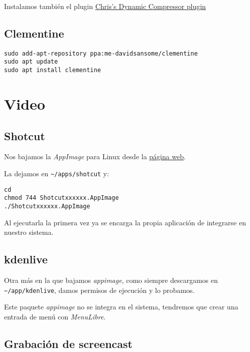 \documentclass[
  12pt,
  spanish,
]{article}
\begin{document}
Instalamos también el plugin
\href{https://theaudacitytopodcast.com/chriss-dynamic-compressor-plugin-for-audacity/}{Chris's
Dynamic Compressor plugin}

\hypertarget{clementine}{%
\subsection{Clementine}\label{clementine}}

\begin{verbatim}
sudo add-apt-repository ppa:me-davidsansome/clementine
sudo apt update
sudo apt install clementine
\end{verbatim}

\hypertarget{video}{%
\section{Video}\label{video}}

\hypertarget{shotcut}{%
\subsection{Shotcut}\label{shotcut}}

Nos bajamos la \emph{AppImage} para Linux desde la
\href{https://www.shotcut.org/}{página web}.

La dejamos en \texttt{\textasciitilde{}/apps/shotcut} y:

\begin{verbatim}
cd
chmod 744 Shotcutxxxxxx.AppImage
./Shotcutxxxxxx.AppImage
\end{verbatim}

Al ejecutarla la primera vez ya se encarga la propia aplicación de
integrarse en nuestro sistema.

\hypertarget{kdenlive}{%
\subsection{kdenlive}\label{kdenlive}}

Otra más en la que bajamos \emph{appimage}, como siempre descargamos en
\texttt{\textasciitilde{}/app/kdenlive}, damos permisos de ejecución y
lo probamos.

Este paquete \emph{appimage} no se integra en el sistema, tendremos que
crear una entrada de menú con \emph{MenuLibre}.

\hypertarget{grabaciuxf3n-de-screencast}{%
\subsection{Grabación de screencast}\label{grabaciuxf3n-de-screencast}}
\end{document}
